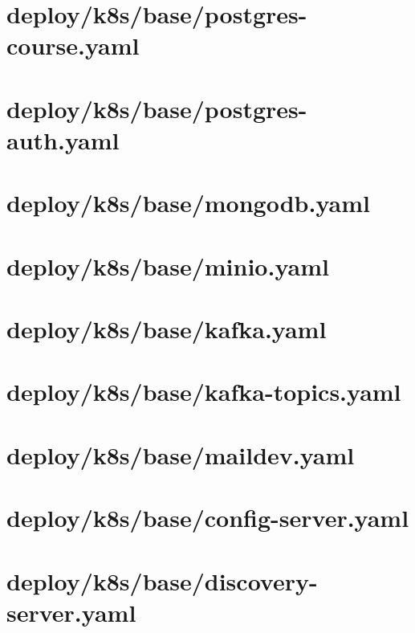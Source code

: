 \section*{deploy/k8s/base/postgres-course.yaml}


\section*{deploy/k8s/base/postgres-auth.yaml}


\section*{deploy/k8s/base/mongodb.yaml}


\section*{deploy/k8s/base/minio.yaml}


\section*{deploy/k8s/base/kafka.yaml}


\section*{deploy/k8s/base/kafka-topics.yaml}


\section*{deploy/k8s/base/maildev.yaml}


\section*{deploy/k8s/base/config-server.yaml}


\section*{deploy/k8s/base/discovery-server.yaml}


